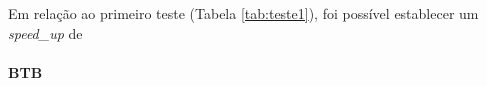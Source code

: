 Em relação ao primeiro teste (Tabela \ref{tab:teste1}), foi possível establecer um \textit{speed\_up} de 


\paragraph{BTB}